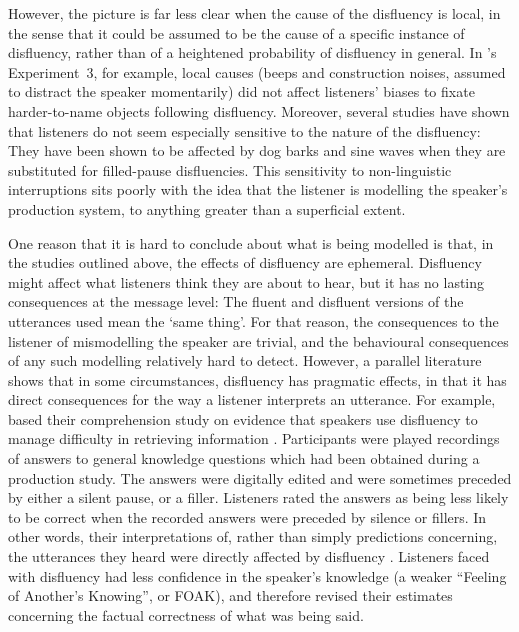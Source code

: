 \documentclass[a4paper,man,natbib]{apa6}
\begin{document}
However, the picture is far less clear when the cause of the disfluency is local, in the sense that it could be assumed to be the cause of a specific instance of disfluency, rather than of a heightened probability of disfluency in general.
In \citeauthor{Arnold2007}'s Experiment~3, for example, local causes (beeps and construction noises, assumed to distract the speaker momentarily) did not affect listeners' biases to fixate harder-to-name objects following disfluency.
Moreover, several studies have shown that listeners do not seem especially sensitive to the nature of the disfluency:  They have been shown to be affected by dog barks \citep{bailey2003disfluencies} and sine waves \citep{corley2011helps} when they are substituted for filled-pause disfluencies.
This sensitivity to non-linguistic interruptions sits poorly with the idea that the listener is modelling the speaker's production system, to anything greater than a superficial extent.

One reason that it is hard to conclude about what is being modelled is that, in the studies outlined above, the effects of disfluency are ephemeral.
Disfluency might affect what listeners think they are about to hear, but it has no lasting consequences at the message level:
The fluent and disfluent versions of the utterances used mean the `same thing'.
For that reason, the consequences to the listener of mismodelling the speaker are trivial, and the behavioural consequences of any such modelling relatively hard to detect.
However, a parallel literature shows that in some circumstances, disfluency has pragmatic effects, in that it has direct consequences for the way a listener interprets an utterance.
%
For example, \citet{Brennan1995} based their comprehension study on evidence that speakers use disfluency to manage difficulty in retrieving information \citep{Smith1993}.
Participants were played recordings of answers to general knowledge questions which had been obtained during a production study.
The answers were digitally edited and were sometimes preceded by either a silent pause, or a filler.
Listeners rated the answers as being less likely to be correct when the recorded answers were preceded by silence or fillers.
In other words, their interpretations of, rather than simply predictions concerning, the utterances they heard were directly affected by disfluency \citep[see also][]{Swerts2005}.
Listeners faced with disfluency had less confidence in the speaker's knowledge (a weaker ``Feeling of Another's Knowing'', or FOAK), and therefore revised their estimates concerning the factual correctness of what was being said.
\end{document}
